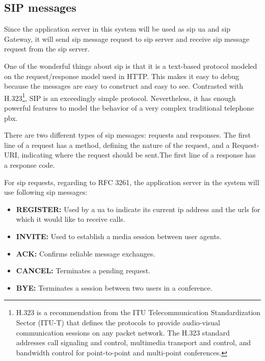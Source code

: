 \subsection{SIP messages}
\noindent Since the application server in this system will be used as \gls{sip} \gls{ua} and \gls{sip} Gateway, it will send \gls{sip} message request to \gls{sip} server and receive \gls{sip} message request from the \gls{sip} server.

\par One of the wonderful things about \gls{sip} is that it is a text-based protocol modeled on the request/response model used in HTTP.  This makes it easy to debug because the messages are easy to construct and easy to see.  Contrasted with H.323\footnote{H.323 is a recommendation from the ITU Telecommunication Standardization Sector (ITU-T) that defines the protocols to provide audio-visual communication sessions on any packet network. The H.323 standard addresses call signaling and control, multimedia transport and control, and bandwidth control for point-to-point and multi-point conferences.\cite{wiki:h323}}, SIP is an exceedingly simple protocol.  Nevertheless, it has enough powerful features to model the behavior of a very complex traditional telephone \gls{pbx}.\cite{networkworld:sip}

\par There are two different types of \gls{sip} messages: requests and responses. The first line of a request has a method, defining the nature of the request, and a Request-URI, indicating where the request should be sent.The first line of a response has a response code.

\noindent For sip requests, regarding to RFC 3261\cite{rfc:3261}, the application server in the system will use following \gls{sip} messages:

\begin{itemize}[topsep=-1em,parsep=0em,itemsep=0em]
 \item \textbf{REGISTER:} Used by a \gls{ua} to indicate its current \gls{ip} address and the \gls{url}s for which it would like to receive calls.
 \item \textbf{INVITE:} Used to establish a media session between user agents.
 \item \textbf{ACK:} Confirms reliable message exchanges.
 \item \textbf{CANCEL:} Terminates a pending request.
 \item \textbf{BYE:} Terminates a session between two users in a conference.
\end{itemize}

